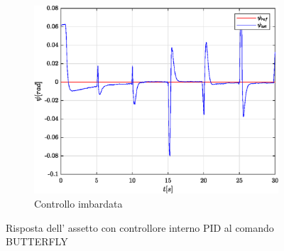 \begin{figure}
	\hfill
	\begin{subfigure}{0.45\textwidth}
		\centering
		\includegraphics[width=1\textwidth]{Simulazioni/Figure/PID/BUTTERFLY/AttitudeControlYaw}
		\caption{Controllo imbardata}
		\label{fig:BUTTERFLYerryawPID}
	\end{subfigure}
	\caption{Risposta dell' assetto con controllore interno PID al comando BUTTERFLY}
\end{figure}


